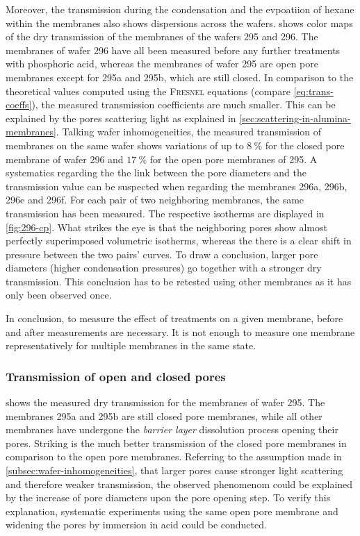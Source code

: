 \documentclass[../thesis.tex]{subfiles}
\begin{document}
        Moreover, the transmission during the condensation and the evpoatiion of hexane within the membranes also shows dispersions across the wafers.  shows color maps of the dry transmission of the membranes of the wafers 295 and 296. The membranes of wafer 296 have all been measured before any further treatments with phosphoric acid, whereas the membranes of wafer 295 are open pore membranes except for 295a and 295b, which are still closed. In comparison to the theoretical values computed using the \textsc{Fresnel} equations (compare \cref{eq:trans-coeffs}), the measured transmission coefficients are much smaller. This can be explained by the pores scattering light as explained in \cref{sec:scattering-in-alumina-membranes}. Talking wafer inhomogeneities, the measured transmission of membranes on the same wafer shows variations of up to $\SI{8}{\percent}$
        for the closed pore membrane of wafer 296 and $\SI{17}{\percent}$ for the open pore membranes of 295. A systematics regarding the the link between the pore diameters and the transmission value can be suspected when regarding the membranes 296a, 296b, 296e and 296f. For each pair of two neighboring membranes, the same transmission has been measured. The respective isotherms are displayed in \cref{fig:296-cp}. What strikes the eye is that the neighboring pores show almost perfectly superimposed volumetric isotherms, whereas the there is a clear shift in pressure between the two pairs' curves. To draw a conclusion, larger pore diameters (higher condensation pressures) go together with a stronger dry transmission. This conclusion has to be retested using other membranes as it has only been observed once.

        

        In conclusion, to measure the effect of treatments on a given membrane, before and after measurements are necessary. It is not enough to measure one membrane representatively for multiple membranes in the same state.


        \subsubsection{Transmission of open and closed pores}

           shows the measured dry transmission for the membranes of wafer 295. The membranes 295a and 295b are still closed pore membranes, while all other membranes have undergone the \textit{barrier layer} dissolution process opening their pores. Striking is the much better transmission of the closed pore membranes in comparison to the open pore membranes. Referring to the assumption made in \cref{subsec:wafer-inhomogeneities}, that larger pores cause stronger light scattering and therefore weaker transmission, the observed phenomenom could be explained by the increase of pore diameters upon the pore opening step. To verify this explanation, systematic experiments using the same open pore membrane and widening the pores by immersion in acid could be conducted.
\end{document}
